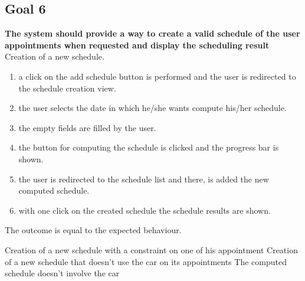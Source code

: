 

\subsection{Goal 6}
\textbf{The system should provide a way to create a valid schedule of the user appointments when requested and display the scheduling result}\\

{Creation of a new schedule.}
{{\begin{enumerate}
\item a click on the add schedule button is performed and the user is redirected to the schedule creation view.
\item the user selects the date in which he/she wants compute his/her schedule.
\item the empty fields are filled by the user.
\item the button for computing the schedule is clicked and the progress bar is shown.
\item the user is redirected to the schedule list and there, is added the new computed schedule.
\item with one click on the created schedule the schedule results are shown.
\end{enumerate}}}
{The outcome is equal to the expected behaviour.}


{Creation of a new schedule with a constraint on one of his appointment}
{Creation of a new schedule that doesn't use the car on its appointments}
{The computed schedule doesn't involve the car}

